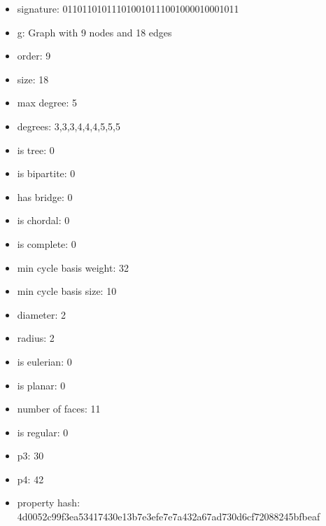 \newpage
\begin{figure}
\end{figure}
\begin{itemize}
\item signature: 011011010111010010111001000010001011
\item g: Graph with 9 nodes and 18 edges
\item order: 9
\item size: 18
\item max degree: 5
\item degrees: 3,3,3,4,4,4,5,5,5
\item is tree: 0
\item is bipartite: 0
\item has bridge: 0
\item is chordal: 0
\item is complete: 0
\item min cycle basis weight: 32
\item min cycle basis size: 10
\item diameter: 2
\item radius: 2
\item is eulerian: 0
\item is planar: 0
\item number of faces: 11
\item is regular: 0
\item p3: 30
\item p4: 42
\item property hash: 4d0052c99f3ea53417430e13b7e3efe7e7a432a67ad730d6cf72088245bfbeaf
\end{itemize}
